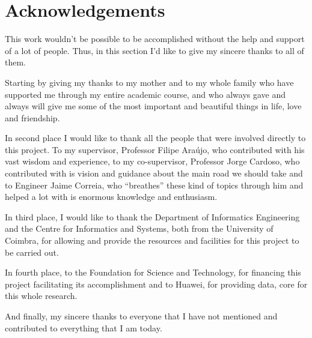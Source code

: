 
\section*{Acknowledgements}
\label{sec:acknowledgements}


This work wouldn't be possible to be accomplished without the help and support of a lot of people. Thus, in this section I'd like to give my sincere thanks to all of them.

Starting by giving my thanks to my mother and to my whole family who have supported me through my entire academic course, and who always gave and always will give me some of the most important and beautiful things in life, love and friendship.

In second place I would like to thank all the people that were involved directly to this project. To my supervisor, Professor Filipe Araújo, who contributed with his vast wisdom and experience, to my co-supervisor, Professor Jorge Cardoso, who contributed with is vision and guidance about the main road we should take and to Engineer Jaime Correia, who ``breathes'' these kind of topics through him and helped a lot with is enormous knowledge and enthusiasm.

In third place, I would like to thank the Department of Informatics Engineering and the Centre for Informatics and Systems, both from the University of Coimbra, for allowing and provide the resources and facilities for this project to be carried out.

In fourth place, to the Foundation for Science and Technology, for financing this project facilitating its accomplishment and to Huawei, for providing data, core for this whole research.

And finally, my sincere thanks to everyone that I have not mentioned and contributed to everything that I am today.


\restoregeometry